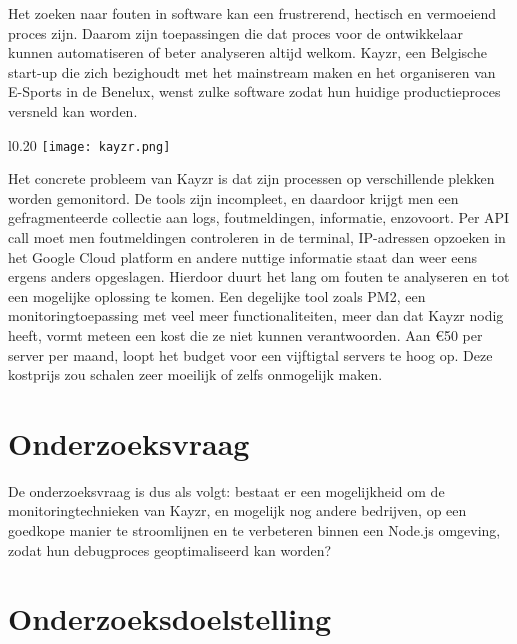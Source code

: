 Het zoeken naar fouten in software kan een frustrerend, hectisch en vermoeiend proces zijn. Daarom zijn toepassingen die dat proces voor de ontwikkelaar kunnen automatiseren of beter analyseren altijd welkom. Kayzr, een Belgische start-up die zich bezighoudt met het mainstream maken en het organiseren van E-Sports in de Benelux, wenst zulke software zodat hun huidige productieproces versneld kan worden. 
\begin{wrapfigure}{l}{0.20\textwidth}
	\texttt{[image: kayzr.png]}
\end{wrapfigure} Het concrete probleem van Kayzr is dat zijn processen op verschillende plekken worden gemonitord. De tools zijn incompleet, en daardoor krijgt men een gefragmenteerde collectie aan logs, foutmeldingen, informatie, enzovoort.  Per API call moet men foutmeldingen controleren in de terminal, IP-adressen opzoeken in het Google Cloud platform en andere nuttige informatie staat dan weer eens ergens anders opgeslagen. Hierdoor duurt het lang om fouten te analyseren en tot een mogelijke oplossing te komen. Een degelijke tool zoals PM2, een monitoringtoepassing met veel meer functionaliteiten, meer dan dat Kayzr nodig heeft, vormt meteen een kost die ze niet kunnen verantwoorden. Aan \euro 50 per server per maand, loopt het budget voor een vijftigtal servers te hoog op. Deze kostprijs zou schalen zeer moeilijk of zelfs onmogelijk maken.

\section{Onderzoeksvraag}
\label{sec:onderzoeksvraag}

De onderzoeksvraag is dus als volgt: bestaat er een mogelijkheid om de monitoringtechnieken van Kayzr, en mogelijk nog andere bedrijven, op een goedkope manier te stroomlijnen en te verbeteren binnen een Node.js omgeving, zodat hun debugproces geoptimaliseerd kan worden? 


\section{Onderzoeksdoelstelling}
\label{sec:onderzoeksdoelstelling}

